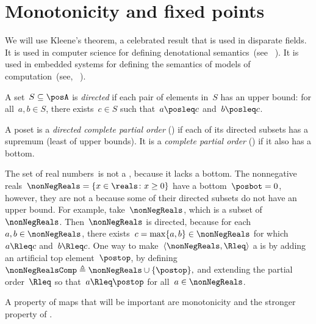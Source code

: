 

\section{Monotonicity and fixed points}
\label{sec:Monotonicity-and-fixed}

We will use Kleene's theorem, a celebrated result that is used in
disparate fields. It is used in computer science for defining denotational
semantics~(see \eg~\cite{manes86}). It is used in embedded systems
for defining the semantics of models of computation~(see, \eg~\cite{lee10}).

\begin{definition}
  \label{def:directed-set}
  A set~$S\subseteq\posA$ is \emph{directed} if each pair of elements
  in~$S$ has an upper bound: for all~$a,b\in S$, there exists~$c\in S$
  such that~$a\posleq c$ and~$b\posleq c$.
\end{definition}

\begin{definition}[Completeness]
  \label{def:cpo}A poset is a \emph{directed complete partial order}
  (\DCPO) if each of its directed subsets has a supremum (least of
  upper bounds). It is a \emph{complete partial order} (\CPO) if it
  also has a bottom.

\end{definition}
\begin{example}
  \label{exa:Rcomp}The set of real numbers~\reals is not
  a \CPO, because it lacks a bottom. The nonnegative reals~$\nonNegReals=\{x\in\reals \colon x\geq0\}$
  have a bottom~$\posbot=0$, however, they are not a \DCPO because some
  of their directed subsets do not have an upper bound. For example,
  take~$\nonNegReals$, which is a subset of~$\nonNegReals$. Then~$\nonNegReals$
  is directed, because for each~$a,b\in\nonNegReals$, there exists~$c=\max\{a,b\}\in\nonNegReals$
  for which~$a\Rleq c$ and~$b\Rleq c$. One way to make~$\left\langle \nonNegReals,\Rleq\right\rangle $
  a \CPO is by adding an artificial top element~$\postop$, by defining~$\nonNegRealsComp\triangleq\nonNegReals\cup\{\postop\},$
  and extending the partial order~$\Rleq$ so that~$a\Rleq\postop$ for
  all~$a\in\nonNegReals$.
\end{example}

A property of maps that will be important are monotonicity and
the stronger property of \scottcontinuity.

